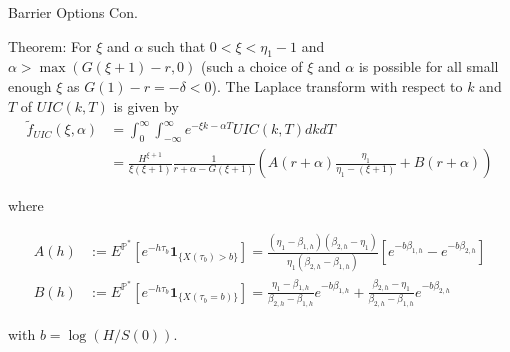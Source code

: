 \documentclass{beamer}
\begin{document}
\begin{frame}{Barrier Options Con.}

    {\footnotesize \footnotesize
    \par Theorem:  For \(\xi\) and \(\alpha\) such that \(0 < \xi < \eta_1 - 1\) and \(\alpha > \max(G(\xi + 1) - r, 0)\) (such a choice of \(\xi\) and \(\alpha\) is possible 
    for all small enough \(\xi\) as \(G(1) - r = -\delta < 0\)). The Laplace transform with respect to \(k\) and \(T\) of \(UIC(k, T)\) is given by
    \begin{align*}
    \tilde{f}_{UIC}(\xi, \alpha) &= \int_{0}^{\infty} \int_{-\infty}^{\infty} e^{-\xi k - \alpha T} UIC(k, T) dk dT \\
    &= \frac{H^{\xi+1}}{\xi (\xi + 1)} \frac{1}{r + \alpha - G(\xi + 1)} \left( A(r + \alpha) \frac{\eta_1}{\eta_1 - (\xi + 1)} + B(r + \alpha) \right)
    \end{align*}
    \par where

    \begin{align*}
    A(h) &:= E^{\mathbb{P}^*} \left[ e^{-h\tau_b} \mathbf{1}_{\{X(\tau_b) > b\}} \right] =
     \frac{(\eta_1 - \beta_{1,h}) (\beta_{2,h} - \eta_1)}{\eta_1 (\beta_{2,h} - \beta_{1,h})} \left[ e^{-b\beta_{1,h}} - e^{-b\beta_{2,h}} \right]\\
    B(h) &:= E^{\mathbb{P}^*} \left[ e^{-h\tau_b} \mathbf{1}_{\{X(\tau_b = b)\}} \right] =
    \frac{\eta_1 - \beta_{1,h}}{\beta_{2,h} - \beta_{1,h}} e^{-b\beta_{1,h}} + \frac{\beta_{2,h} - \eta_1}{\beta_{2,h} - \beta_{1,h}} e^{-b\beta_{2,h}}
    \end{align*}
    \par with \(b = \log(H/S(0))\).
    }
    


\end{frame}
\end{document}
